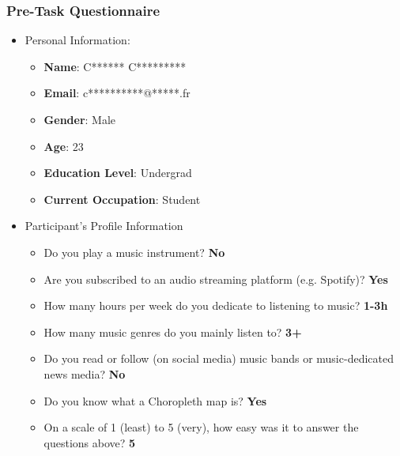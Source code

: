 \documentclass[twocolumn, letterpaper,13pt]{scrartcl}
\begin{document}
    \subsubsection*{Pre-Task Questionnaire}
    \begin{itemize}
        \item Personal Information: 
        \begin{itemize}
            \item \textbf{Name}: C****** C*********
            \item \textbf{Email}: c**********@*****.fr
            \item \textbf{Gender}: Male
            \item \textbf{Age}: 23
            \item \textbf{Education Level}: Undergrad
            \item \textbf{Current Occupation}: Student 
        \end{itemize}
        \item Participant's Profile Information
        \begin{itemize}
            \item Do you play a music instrument? \textbf{No}
            \item Are you subscribed to an audio streaming platform (e.g. Spotify)? \textbf{Yes}
            \item How many hours per week do you dedicate to listening to music? \textbf{1-3h}
            \item How many music genres do you mainly listen to? \textbf{3+}
            \item Do you read or follow (on social media) music bands or music-dedicated news media? \textbf{No}
            \item Do you know what a Choropleth map is? \textbf{Yes}
            \item On a scale of 1 (least) to 5 (very), how easy was it to answer the questions above? \textbf{5}
        \end{itemize}
    \end{itemize}
    
\end{document}
